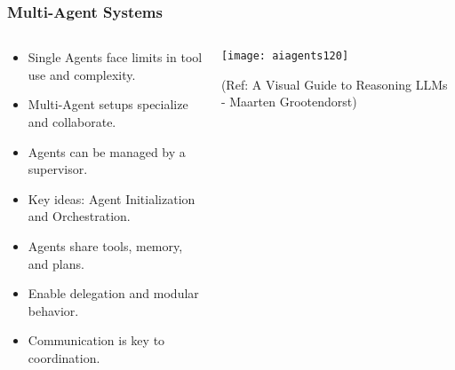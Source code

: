 \begin{frame}[fragile]\frametitle{Multi-Agent Systems}
\begin{columns}
    \begin{column}[T]{0.6\linewidth}
      \begin{itemize}
        \item Single Agents face limits in tool use and complexity.
        \item Multi-Agent setups specialize and collaborate.
        \item Agents can be managed by a supervisor.
        \item Key ideas: Agent Initialization and Orchestration.
        \item Agents share tools, memory, and plans.
        \item Enable delegation and modular behavior.
        \item Communication is key to coordination.
      \end{itemize}
    \end{column}
    \begin{column}[T]{0.4\linewidth}
        \begin{center}
        \texttt{[image: aiagents120]}
		
        {\tiny (Ref: A Visual Guide to Reasoning LLMs - Maarten Grootendorst)}
        \end{center}
    \end{column}
\end{columns}
\end{frame}


